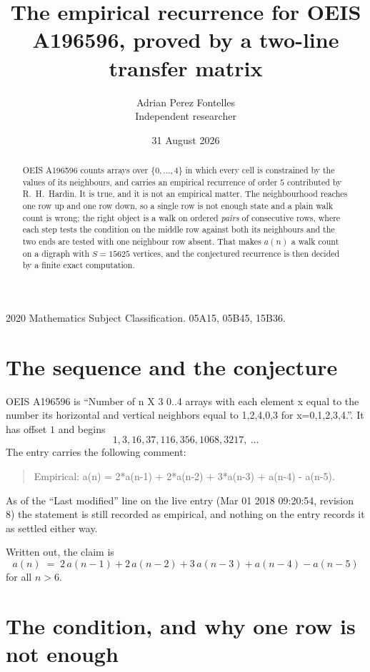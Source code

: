 \documentclass[11pt,a4paper]{article}
\title{The empirical recurrence for OEIS A196596, proved by a two-line transfer matrix}
\author{Adrian Perez Fontelles\\ \small Independent researcher}
\date{31 August 2026}
\theoremstyle{plain}
\theoremstyle{definition}
\begin{document}
\maketitle

\begin{abstract}
OEIS A196596 counts arrays over $\{0,\dots,4\}$ in which every cell is constrained by the
values of its neighbours, and carries an empirical recurrence of order $5$ contributed
by R.~H.~Hardin. It is true, and it is not an empirical matter. The neighbourhood reaches one
row up and one row down, so a single row is not enough state and a plain walk count
is wrong; the right object is a walk on ordered \emph{pairs} of consecutive rows, where
each step tests the condition on the middle row against both its neighbours and the two
ends are tested with one neighbour row absent. That makes $a(n)$ a walk count on a digraph
with $S=15625$ vertices, and the conjectured recurrence is then decided by a finite exact
computation.
\end{abstract}

\noindent\small 2020 Mathematics Subject Classification. 05A15, 05B45, 15B36.\normalsize

\section{The sequence and the conjecture}

OEIS A196596 is ``Number of n X 3 0..4 arrays with each element x equal to the number its horizontal and vertical neighbors equal to 1,2,4,0,3 for x=0,1,2,3,4.''. It has offset $1$ and begins
\[
1, 3, 16, 37, 116, 356, 1068, 3217,\ \dots
\]
The entry carries the following comment:
\begin{quote}\small
Empirical: a(n) = 2*a(n-1) + 2*a(n-2) + 3*a(n-3) + a(n-4) - a(n-5).
\end{quote}
As of the ``Last modified'' line on the live entry (Mar 01 2018 09:20:54, revision 8) the statement is
still recorded as empirical, and nothing on the entry records it as settled either way.

Written out, the claim is
\begin{equation}\label{eq:conj}
a(n)\;=\;2\,a(n-1) + 2\,a(n-2) + 3\,a(n-3) + a(n-4) - a(n-5)
\end{equation}
for all $n>6$.

\section{The condition, and why one row is not enough}
\end{document}
